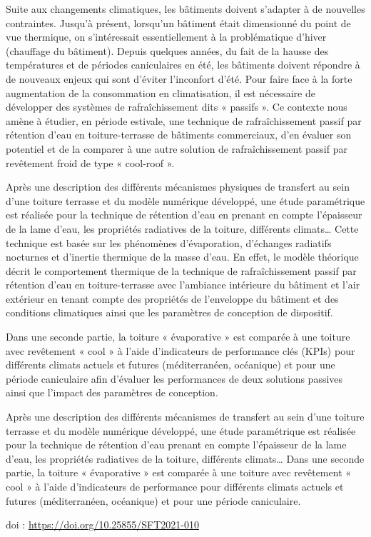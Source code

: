 {\normalsize
Suite aux changements climatiques, les bâtiments doivent s'adapter à de nouvelles contraintes. Jusqu'à présent, lorsqu'un bâtiment était dimensionné du point de vue thermique, on s'intéressait essentiellement à la problématique d'hiver (chauffage du bâtiment). Depuis quelques années, du fait de la hausse des températures et de périodes caniculaires en été, les bâtiments doivent répondre à de nouveaux enjeux qui sont d'éviter l'inconfort d'été. Pour faire face à la forte augmentation de la consommation en climatisation, il est nécessaire de développer des systèmes de rafraîchissement dits « passifs ». Ce contexte nous amène à étudier, en période estivale, une technique de rafraîchissement passif par rétention d'eau en toiture-terrasse de bâtiments commerciaux, d'en évaluer son potentiel et de la comparer à une autre solution de rafraîchissement passif par revêtement froid de type « cool-roof ».



Après une description des différents mécanismes physiques de transfert au sein d'une toiture terrasse et du modèle numérique développé, une étude paramétrique est réalisée pour la technique de rétention d'eau en prenant en compte l'épaisseur de la lame d'eau, les propriétés radiatives de la toiture, différents climats… Cette technique est basée sur les phénomènes d'évaporation, d'échanges radiatifs nocturnes et d'inertie thermique de la masse d'eau. En effet, le modèle théorique décrit le comportement thermique de la technique de rafraîchissement passif par rétention d'eau en toiture-terrasse avec l'ambiance intérieure du bâtiment et l'air extérieur en tenant compte des propriétés de l'enveloppe du bâtiment et des conditions climatiques ainsi que les paramètres de conception de dispositif.



Dans une seconde partie, la toiture « évaporative » est comparée à une toiture avec revêtement « cool » à l'aide d'indicateurs de performance clés (KPIs) pour différents climats actuels et futures (méditerranéen, océanique) et pour une période caniculaire afin d'évaluer les performances de deux solutions passives ainsi que l'impact des paramètres de conception.



Après une description des différents mécanismes de transfert au sein d'une toiture terrasse et du modèle numérique développé, une étude paramétrique est réalisée pour la technique de rétention d'eau prenant en compte l'épaisseur de la lame d'eau, les propriétés radiatives de la toiture, différents climats… Dans une seconde partie, la toiture « évaporative » est comparée à une toiture avec revêtement « cool » à l'aide d'indicateurs de performance pour différents climats actuels et futures (méditerranéen, océanique) et pour une période caniculaire.

 \vfill doi : \url{https://doi.org/10.25855/SFT2021-010}

}
 
